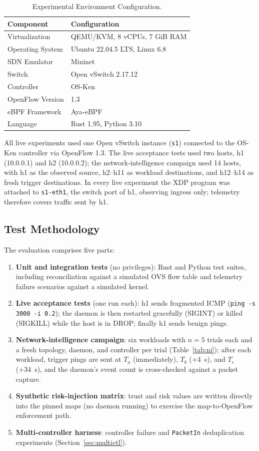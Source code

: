 \documentclass[conference]{IEEEtran}
\begin{document}
\begin{table}[h]
\centering
\caption{Experimental Environment Configuration.}
\label{tab:env}
\begin{tabular}{ll}
\toprule
Component & Configuration \\
\midrule
Virtualization & QEMU/KVM, 8 vCPUs, 7 GiB RAM \\
Operating System & Ubuntu 22.04.5 LTS, Linux 6.8 \\
SDN Emulator & Mininet \\
Switch & Open vSwitch 2.17.12 \\
Controller & OS-Ken \\
OpenFlow Version & 1.3 \\
eBPF Framework & Aya-eBPF \\
Language & Rust 1.95, Python 3.10 \\
\bottomrule
\end{tabular}
\end{table}

All live experiments used one Open vSwitch instance (\texttt{s1}) connected to the OS-Ken controller via OpenFlow 1.3. The live acceptance tests used two hosts, h1 (10.0.0.1) and h2 (10.0.0.2); the network-intelligence campaign used 14 hosts, with h1 as the observed source, h2--h11 as workload destinations, and h12--h14 as fresh trigger destinations. In every live experiment the XDP program was attached to \texttt{s1-eth1}, the switch port of h1, observing ingress only; telemetry therefore covers traffic sent by h1.

\subsection{Test Methodology}
The evaluation comprises five parts:
\begin{enumerate}
\item \textbf{Unit and integration tests} (no privileges): Rust and Python test suites, including reconciliation against a simulated OVS flow table and telemetry failure scenarios against a simulated kernel.
\item \textbf{Live acceptance tests} (one run each): h1 sends fragmented ICMP (\texttt{ping -s 3000 -i 0.2}); the daemon is then restarted gracefully (SIGINT) or killed (SIGKILL) while the host is in DROP; finally h1 sends benign pings.
\item \textbf{Network-intelligence campaign}: six workloads with $n=5$ trials each and a fresh topology, daemon, and controller per trial (Table~\ref{tab:ni}); after each workload, trigger pings are sent at $T_a$ (immediately), $T_b$ (+4~s), and $T_c$ (+34~s), and the daemon's event count is cross-checked against a packet capture.
\item \textbf{Synthetic risk-injection matrix}: trust and risk values are written directly into the pinned maps (no daemon running) to exercise the map-to-OpenFlow enforcement path.
\item \textbf{Multi-controller harness}: controller failure and \texttt{PacketIn} deduplication experiments (Section~\ref{sec:multictl}).
\end{enumerate}
\end{document}
